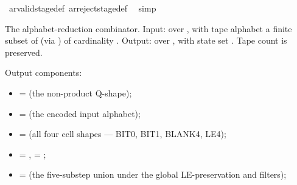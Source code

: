\begin{isabellebody}
\ ar{\isacharunderscore}{\kern0pt}valid{\isacharunderscore}{\kern0pt}stage{\isacharunderscore}{\kern0pt}def\ ar{\isacharunderscore}{\kern0pt}reject{\isacharunderscore}{\kern0pt}stage{\isacharunderscore}{\kern0pt}def\ \isamarkupfalse%
\ simp\isanewline
{}\isamarkupfalse%
%
\endisatagproof
{\isafoldproof}%
%
\isadelimproof
%
\endisadelimproof
%
\begin{isamarkuptext}%
The alphabet-reduction combinator.  Input:  over
, with tape alphabet  a finite subset of
 (via ) of cardinality .
Output:  over , with state set
.  Tape count  is preserved.

Output components:

%
\begin{itemize}%
\item {} = 
(the non-product Q-shape);

\item \isa{{\isasymSigma}{\isacharprime}{\kern0pt}} = 
(the encoded input alphabet);

\item \isa{{\isasymGamma}{\isacharprime}{\kern0pt}} = 
(all four cell shapes — BIT0, BIT1, BLANK4, LE4);

\item {} = ,  = ;

\item \isa{{\isasymdelta}{\isacharprime}{\kern0pt}} = 
(the five-substep union under the global LE-preservation
and  filters);


\end{itemize}
\end{isamarkuptext}
\end{isabellebody}

